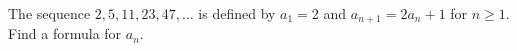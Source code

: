 The sequence $2,5,11,23,47,\dots$ is defined by $a_1=2$ and $a_{n+1}=2a_n+1$ for $n\ge1$. Find a formula for $a_n$.
